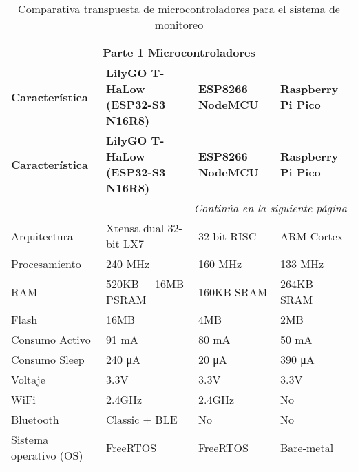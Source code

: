 \renewcommand{\arraystretch}{1.5}
\small
\begin{longtable}{|p{3cm}|p{4cm}|p{4cm}|p{4cm}|}
\caption{Comparativa transpuesta de microcontroladores para el sistema de monitoreo}
\label{tab:comparativa_microcontroladores_transpuesta} \\
\hline
\multicolumn{4}{|c|}{Parte 1 Microcontroladores}\\
\hline
\textbf{Característica} 
& \textbf{LilyGO T-HaLow (ESP32-S3 N16R8)} \cite{lilygo_t-halow2025}
& \textbf{ESP8266 NodeMCU} \cite{espressif2023_ESP8266EX}
& \textbf{Raspberry Pi Pico}  \cite{raspberrypi2024_Pico_datasheet} \\
\hline
\endfirsthead

\hline
\textbf{Característica} 
& \textbf{LilyGO T-HaLow (ESP32-S3 N16R8)} \cite{lilygo_t-halow2025}
& \textbf{ESP8266 NodeMCU} \cite{espressif2023_ESP8266EX}
& \textbf{Raspberry Pi Pico} \cite{raspberrypi2024_Pico_datasheet} \\
\hline
\endhead

\hline
\multicolumn{4}{r}{\textit{Continúa en la siguiente página}} \\
\endfoot

\hline
\endlastfoot

Arquitectura 
& Xtensa dual 32-bit LX7 
& 32-bit RISC 
& ARM Cortex \\ \hline

Procesamiento 
& 240 MHz 
& 160 MHz 
& 133 MHz \\ \hline

RAM 
& 520KB + 16MB PSRAM 
& 160KB SRAM 
& 264KB SRAM \\ \hline

Flash 
& 16MB 
& 4MB 
& 2MB \\ \hline

Consumo Activo 
& 91 mA& 80 mA & 50 mA \\
Consumo Sleep & 240 \unit{\uA} & 20 \unit{\uA} & 390 \unit{\uA} \\ \hline

Voltaje &3.3V & 3.3V & 3.3V \\ \hline

WiFi 
& 2.4GHz 
& 2.4GHz 
& No \\ \hline

Bluetooth 
& Classic + BLE 
& No 
& No \\ \hline

Sistema operativo (OS) 
& FreeRTOS 
& FreeRTOS 
& Bare-metal \\ \hline


\end{longtable}

